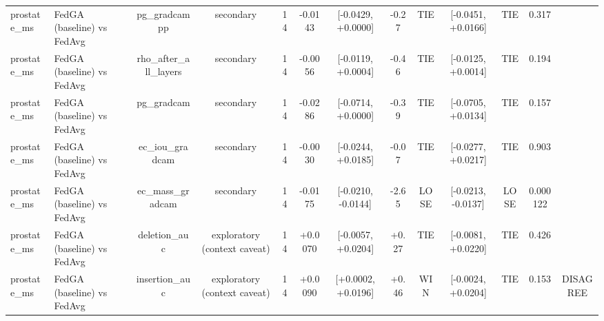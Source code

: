 \begin{tabular}{llccccccccccc}
prostate\_ms & FedGA (baseline) vs FedAvg & pg\_gradcampp & secondary & 14 & -0.0143 & [-0.0429, +0.0000] & -0.27 & TIE & [-0.0451, +0.0166] & TIE & 0.317 &  \\
prostate\_ms & FedGA (baseline) vs FedAvg & rho\_after\_all\_layers & secondary & 14 & -0.0056 & [-0.0119, +0.0004] & -0.46 & TIE & [-0.0125, +0.0014] & TIE & 0.194 &  \\
prostate\_ms & FedGA (baseline) vs FedAvg & pg\_gradcam & secondary & 14 & -0.0286 & [-0.0714, +0.0000] & -0.39 & TIE & [-0.0705, +0.0134] & TIE & 0.157 &  \\
prostate\_ms & FedGA (baseline) vs FedAvg & ec\_iou\_gradcam & secondary & 14 & -0.0030 & [-0.0244, +0.0185] & -0.07 & TIE & [-0.0277, +0.0217] & TIE & 0.903 &  \\
prostate\_ms & FedGA (baseline) vs FedAvg & ec\_mass\_gradcam & secondary & 14 & -0.0175 & [-0.0210, -0.0144] & -2.65 & LOSE & [-0.0213, -0.0137] & LOSE & 0.000122 &  \\
prostate\_ms & FedGA (baseline) vs FedAvg & deletion\_auc & exploratory (context caveat) & 14 & +0.0070 & [-0.0057, +0.0204] & +0.27 & TIE & [-0.0081, +0.0220] & TIE & 0.426 &  \\
prostate\_ms & FedGA (baseline) vs FedAvg & insertion\_auc & exploratory (context caveat) & 14 & +0.0090 & [+0.0002, +0.0196] & +0.46 & WIN & [-0.0024, +0.0204] & TIE & 0.153 & DISAGREE \\
\hline
\end{tabular}
